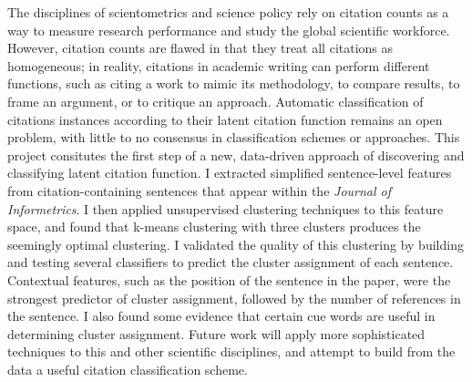 \documentclass[
10pt, %
a4paper, %
oneside, %
headinclude,footinclude, %
BCOR5mm, %
]{scrartcl}
\begin{document}
The disciplines of scientometrics and science policy rely on citation counts as a way to measure research performance and study the global scientific workforce. However, citation counts are flawed in that they treat all citations as homogeneous; in reality, citations in academic writing can perform different functions, such as citing a work to mimic its methodology, to compare results, to frame an argument, or to critique an approach. Automatic classification of citations instances according to their latent citation function remains an open problem, with little to no consensus in classification schemes or approaches. This project consitutes the first step of a new, data-driven approach of discovering and classifying latent citation function. I extracted simplified sentence-level features from citation-containing sentences that appear within the \textit{Journal of Informetrics}. I then applied unsupervised clustering techniques to this feature space, and found that k-means clustering with three clusters produces the seemingly optimal clustering. I validated the quality of this clustering by building and testing several classifiers to predict the cluster assignment of each sentence. Contextual features, such as the position of the sentence in the paper, were the strongest predictor of cluster assignment, followed by the number of references in the sentence. I also found some evidence that certain cue words are useful in determining cluster assignment. Future work will apply more sophisticated techniques to this and other scientific disciplines, and attempt to build from the data a useful citation classification scheme. 


\let\thefootnote\relax{}


\newpage %

\end{document}
